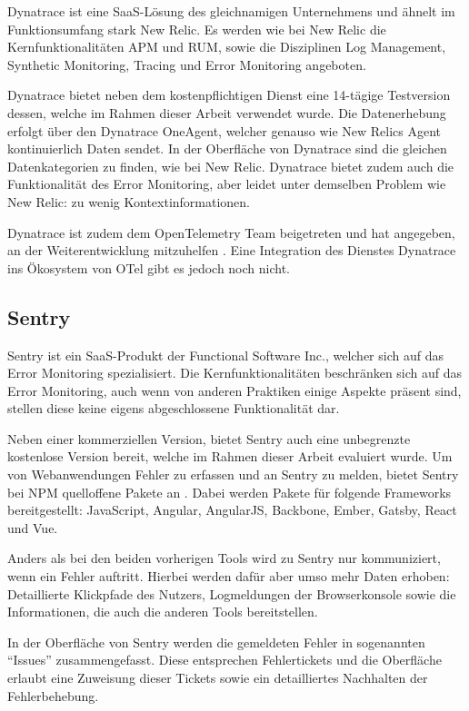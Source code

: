 Dynatrace \cite{Dynatrace} ist eine SaaS-Lösung des gleichnamigen Unternehmens und ähnelt im Funktionsumfang stark New Relic. Es werden wie bei New Relic die Kernfunktionalitäten APM und RUM, sowie die Disziplinen Log Management, Synthetic Monitoring, Tracing und Error Monitoring angeboten.

Dynatrace bietet neben dem kostenpflichtigen Dienst eine 14-tägige Testversion dessen, welche im Rahmen dieser Arbeit verwendet wurde. Die Datenerhebung erfolgt über den Dynatrace OneAgent, welcher genauso wie New Relics Agent kontinuierlich Daten sendet. In der Oberfläche von Dynatrace sind die gleichen Datenkategorien zu finden, wie bei New Relic. Dynatrace bietet zudem auch die Funktionalität des Error Monitoring, aber leidet unter demselben Problem wie New Relic: zu wenig Kontextinformationen.

Dynatrace ist zudem dem OpenTelemetry Team beigetreten und hat angegeben, an der Weiterentwicklung mitzuhelfen \cite{DynatraceJoinOTelProject}. Eine Integration des Dienstes Dynatrace ins Ökosystem von OTel gibt es jedoch noch nicht.

\subsection{Sentry}

Sentry \cite{Sentry} ist ein SaaS-Produkt der Functional Software Inc., welcher sich auf das Error Monitoring spezialisiert. Die Kernfunktionalitäten beschränken sich auf das Error Monitoring, auch wenn von anderen Praktiken einige Aspekte präsent sind, stellen diese keine eigens abgeschlossene Funktionalität dar.

Neben einer kommerziellen Version, bietet Sentry auch eine unbegrenzte kostenlose Version bereit, welche im Rahmen dieser Arbeit evaluiert wurde. Um von Webanwendungen Fehler zu erfassen und an Sentry zu melden, bietet Sentry bei NPM quelloffene Pakete an \cite{SentryJSGithub}. Dabei werden Pakete für folgende Frameworks bereitgestellt: JavaScript, Angular, AngularJS, Backbone, Ember, Gatsby, React und Vue.

Anders als bei den beiden vorherigen Tools wird zu Sentry nur kommuniziert, wenn ein Fehler auftritt. Hierbei werden dafür aber umso mehr Daten erhoben: Detaillierte Klickpfade des Nutzers, Logmeldungen der Browserkonsole sowie die Informationen, die auch die anderen Tools bereitstellen.

In der Oberfläche von Sentry werden die gemeldeten Fehler in sogenannten \enquote{Issues} zusammengefasst. Diese entsprechen Fehlertickets und die Oberfläche erlaubt eine Zuweisung dieser Tickets sowie ein detailliertes Nachhalten der Fehlerbehebung.

